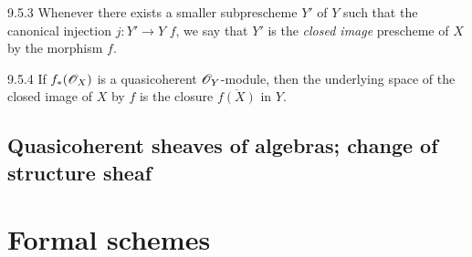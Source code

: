 \documentclass{book}
\begin{document}
\begin{env}[Definition]{9.5.3}
\label{defn-1.9.5.3}
Whenever there exists a smaller subprescheme $Y'$
of $Y$ such that the canonical injection $j\colon Y'\to Y$ \completelyunsure $f$, we
say that $Y'$ is the \emph{closed image} prescheme of $X$ by the morphism $f$.
\end{env}

\begin{envs}[Proposition]{9.5.4}
\label{prop-1.9.5.4}
If $f_\ast(\mathscr{O}_X)$ is a quasicoherent $\mathscr{O}_Y$-module, then the underlying space of
the closed image of $X$ by $f$ is the closure $\overline{f(X)}$ in $Y$.
\end{envs}

\subsection{Quasicoherent sheaves of algebras; change of structure sheaf}
\label{1-schemes-9.6}        

\section{Formal schemes}
\label{1-schemes-10}

\clearpage


\end{document}
